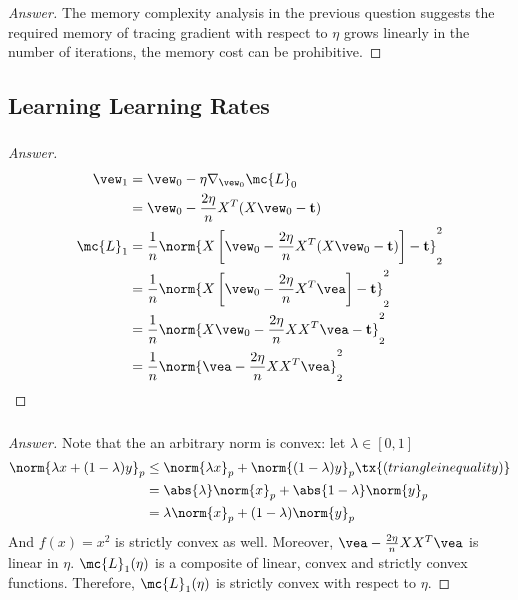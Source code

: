 \documentclass{article}
\begin{document}
	\subsubsection{}
	\begin{proof}[Answer]
		The memory complexity analysis in the previous question suggests the required memory of tracing gradient with respect to $\eta$ grows linearly in the number of iterations, the memory cost can be prohibitive.
	\end{proof}

	\subsection{Learning Learning Rates}
	\subsubsection{}
	\begin{proof}[Answer]
		\begin{align}
			\vew_1
			&= \vew_0 - \eta \nabla_{\vew_0} \mc{L}_0 \\
			&= \vew_0 - \frac{2 \eta}{n} X^T (X \vew_0 - \textbf{t}) \\
			\mc{L}_1
			&= \frac{1}{n} \norm{
				X \left [\vew_0 - \frac{2 \eta}{n} X^T (X \vew_0 - \textbf{t}) \right] - \textbf{t}
			}^2_2 \\
			&= \frac{1}{n} \norm{
				X \left [\vew_0 - \frac{2 \eta}{n} X^T \vea \right] - \textbf{t}
			}^2_2 \\
			&= \frac{1}{n} \norm{
				X \vew_0 - \frac{2 \eta}{n} X X^T \vea - \textbf{t}
			}^2_2 \\
			&= \frac{1}{n} \norm{
				\vea - \frac{2 \eta}{n} X X^T \vea
			}^2_2
		\end{align}
	\end{proof}

	\subsubsection{}
	\begin{proof}[Answer]
		Note that the an arbitrary norm is convex: let $\lambda \in [0, 1]$
		\begin{align}
			\norm{\lambda x + (1 - \lambda) y}_p
			&\leq \norm{\lambda x}_p + \norm{(1 - \lambda) y}_p \tx{ (triangle inequality)} \\
			&= \abs{\lambda} \norm{x}_p + \abs{1 - \lambda} \norm{y}_p \\
			&= \lambda \norm{x}_p + (1 - \lambda) \norm{y}_p
		\end{align}
		And $f(x) = x^2$ is strictly convex as well.
		Moreover, $\vea - \frac{2 \eta}{n} X X^T \vea$ is linear in $\eta$. 
		$\mc{L}_1(\eta)$ is a composite of linear, convex and strictly convex functions. Therefore, $\mc{L}_1(\eta)$ is strictly convex with respect to $\eta$.
	\end{proof}
\end{document}
